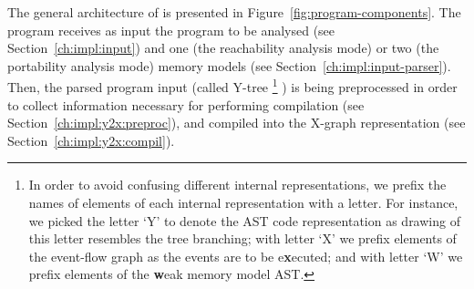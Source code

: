 The general architecture of \porthos[2] is presented in Figure~\ref{fig:program-components}.
The program receives as input the program to be analysed (see Section~\ref{ch:impl:input}) and one (the reachability analysis mode) or two (the portability analysis mode) memory models (see Section~\ref{ch:impl:input-parser}).
Then, the parsed program input (called Y-tree%
\footnote{In order to avoid confusing different internal representations, we prefix the names of elements of each internal representation with a letter. For instance, we picked the letter `Y' to denote the AST code representation as drawing of this letter resembles the tree branching; with letter `X' we prefix elements of the event-flow graph as the events are to be e\textbf{x}ecuted; and with letter `W' we prefix elements of the \textbf{w}eak memory model AST.}%
) is being preprocessed in order to collect information necessary for performing compilation (see Section~\ref{ch:impl:y2x:preproc}), and compiled into the X-graph representation (see Section~\ref{ch:impl:y2x:compil}).



